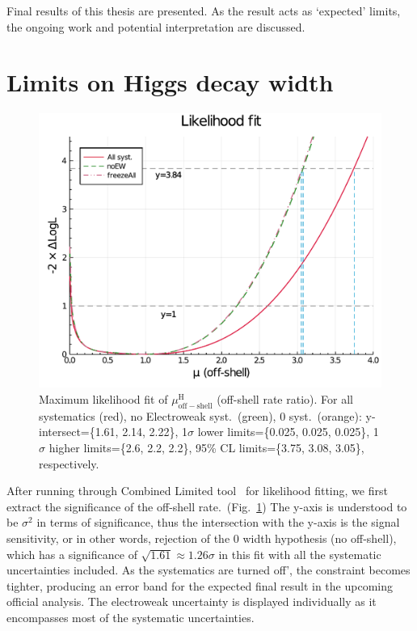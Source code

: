 Final results of this thesis are presented. As the result acts as
`expected' limits, the ongoing work and potential interpretation are discussed.
\pagebreak
\section{Limits on Higgs decay width}
\begin{figure}[htb]
    \centering
    \includegraphics[width=.8\linewidth]{fig/Final_fit_mu_offshell.pdf}
    \caption{Maximum likelihood fit of $\mu^\mathrm{H}_\mathrm{off-shell}$ (off-shell rate ratio).
    For all systematics (red), no Electroweak syst.~(green),
    0 syst.~(orange): y-intersect=\{1.61, 2.14, 2.22\}, 1$\sigma$ lower limits=\{0.025, 0.025, 0.025\},
1$\sigma$ higher limits=\{2.6, 2.2, 2.2\}, 95\% CL limits=\{3.75, 3.08, 3.05\}, respectively.}
    \label{fig:final_fit_mu}
\end{figure}
After running through Combined Limited tool~\cite{combine1, combine2, combine3} for likelihood fitting, we first extract the significance
of the off-shell rate.~(Fig.~\ref{fig:final_fit_mu})
The y-axis is understood to be $\sigma^2$ in terms of significance, thus
the intersection with the y-axis is the signal sensitivity, or in other words,
rejection of the 0 width hypothesis (no off-shell), which has a significance of 
$\sqrt{1.61} \approx 1.26\sigma$ in this fit with all the systematic uncertainties included.
As the systematics are turned off', the constraint becomes tighter, producing an error band for the expected
final result in the upcoming official analysis. The electroweak uncertainty is displayed individually as
it encompasses most of the systematic uncertainties.

